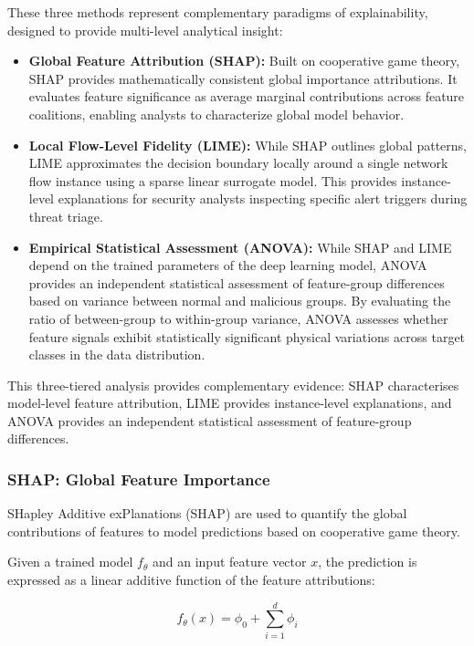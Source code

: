 \documentclass[a4paper,fleqn]{cas-sc}
\begin{document}
These three methods represent complementary paradigms of explainability, designed to provide multi-level analytical insight:
\begin{itemize}
    \item \textbf{Global Feature Attribution (SHAP):} Built on cooperative game theory, SHAP provides mathematically consistent global importance attributions. It evaluates feature significance as average marginal contributions across feature coalitions, enabling analysts to characterize global model behavior.
    \item \textbf{Local Flow-Level Fidelity (LIME):} While SHAP outlines global patterns, LIME approximates the decision boundary locally around a single network flow instance using a sparse linear surrogate model. This provides instance-level explanations for security analysts inspecting specific alert triggers during threat triage.
    \item \textbf{Empirical Statistical Assessment (ANOVA):} While SHAP and LIME depend on the trained parameters of the deep learning model, ANOVA provides an independent statistical assessment of feature-group differences based on variance between normal and malicious groups. By evaluating the ratio of between-group to within-group variance, ANOVA assesses whether feature signals exhibit statistically significant physical variations across target classes in the data distribution.
\end{itemize}
This three-tiered analysis provides complementary evidence: SHAP characterises model-level feature attribution, LIME provides instance-level explanations, and ANOVA provides an independent statistical assessment of feature-group differences.

\subsubsection{SHAP: Global Feature Importance}

SHapley Additive exPlanations (SHAP) are used to quantify the global contributions of features to model predictions based on cooperative game theory.

Given a trained model $f_\theta$ and an input feature vector $x$, the prediction is expressed as a linear additive function of the feature attributions:

\begin{equation}
f_\theta(x) = \phi_0 + \sum_{i=1}^{d} \phi_i
\end{equation}
\end{document}

